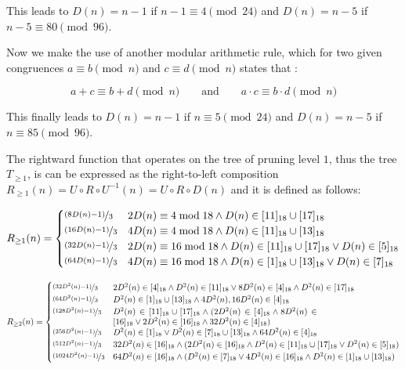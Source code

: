 This leads to $D(n)=n-1$ if $n-1\equiv4\pmod{24}$ and $D(n)=n-5$ if $n-5\equiv80\pmod{96}$.

Now we make the use of another modular arithmetic rule, which for two given congruences $a\equiv b\pmod n$ and $c\equiv d\pmod n$ states that \cite[p.~19]{Ref_Mueller-Stach_2011}:

\begin{equation}
	a+c\equiv b+d\pmod n\hspace{2em} \text{and}\hspace{2em}a\cdot c\equiv b\cdot d\pmod n
\end{equation}

This finally leads to $D(n)=n-1$ if $n\equiv5\pmod{24}$ and $D(n)=n-5$ if $n\equiv85\pmod{96}$.

The rightward function that operates on the tree of pruning level $1$, thus the tree $T_{\ge1}$, is can be expressed as the right-to-left composition $R_{\ge1}(n)=U\circ R\circ U^{-1}(n)=U\circ R\circ D(n)$ and it is defined as follows:

\[
R_{\ge1}(n)=\begin{cases}
	\nicefrac{(8D(n)-1)}{3}	&	2D(n)\equiv4\bmod{18}\wedge D(n)\in[11]_{18}\cup[17]_{18}\\
	\nicefrac{(16D(n)-1)}{3}	&	4D(n)\equiv4\bmod{18}\wedge D(n)\in[11]_{18}\cup[13]_{18}\\
	\nicefrac{(32D(n)-1)}{3}	&	2D(n)\equiv16\bmod{18}\wedge D(n)\in[11]_{18}\cup[17]_{18}\vee D(n)\in[5]_{18}\\
	\nicefrac{(64D(n)-1)}{3}	&	4D(n)\equiv16\bmod{18}\wedge D(n)\in[1]_{18}\cup[13]_{18}\vee D(n)\in[7]_{18}\end{cases}
\]

\[
R_{\ge2}(n)=\begin{cases}
	\nicefrac{(32D^2(n)-1)}{3}	&	2D^2(n)\in[4]_{18}\wedge D^2(n)\in[11]_{18}\vee8D^2(n)\in[4]_{18}\wedge D^2(n)\in[17]_{18}\\
	\nicefrac{(64D^2(n)-1)}{3}	&	D^2(n)\in[1]_{18}\cup[13]_{18}\wedge4D^2(n),16D^2(n)\in[4]_{18}\\
	\nicefrac{(128D^2(n)-1)}{3}	& \parbox[t]{.7\textwidth}{$	D^2(n)\in[11]_{18}\cup[17]_{18}\wedge(2D^2(n)\in[4]_{18}\wedge8D^2(n)\in[16]_{18}\vee2D^2(n)\in[16]_{18}\wedge32D^2(n)\in[4]_{18})$}\\
	\nicefrac{(256D^2(n)-1)}{3}	&	D^2(n)\in[1]_{18}\vee D^2(n)\in[7]_{18}\cup[13]_{18}\wedge64D^2(n)\in[4]_{18}\\
	\nicefrac{(512D^2(n)-1)}{3}	&	32D^2(n)\in[16]_{18}\wedge(2D^2(n)\in[16]_{18}\wedge D^2(n)\in[11]_{18}\cup[17]_{18}\vee D^2(n)\in[5]_{18})\\
	\nicefrac{(1024D^2(n)-1)}{3}	&	64D^2(n)\in[16]_{18}\wedge(D^2(n)\in[7]_{18}\vee4D^2(n)\in[16]_{18}\wedge D^2(n)\in[1]_{18}\cup[13]_{18})\end{cases}
\]

